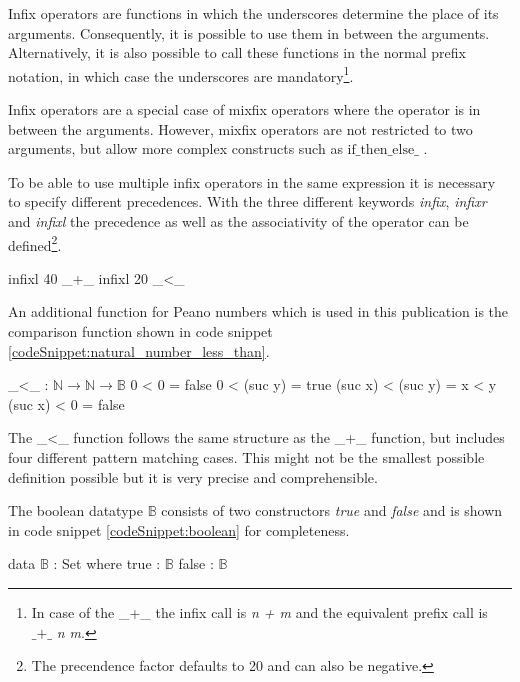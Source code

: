Infix operators are functions in which the underscores determine the place of its arguments. Consequently, it is possible to use them in between the arguments.
Alternatively, it is also possible to call these functions in the normal prefix notation, in which case the underscores are mandatory\footnote{In case of the \_+\_ the infix call is \emph{n + m} and the equivalent prefix call is $\text{\_+\_}$ \emph{n m}.}.

Infix operators are a special case of mixfix operators where the operator is in between the arguments.
However, mixfix operators are not restricted to two arguments, but allow more complex constructs such as $\text{if\_then\_else\_}$ \cite{AgdaReadTheDocs}.

To be able to use multiple infix operators in the same expression it is necessary to specify different precedences.
With the three different keywords \emph{infix}, \emph{infixr} and \emph{infixl} the precedence as well as the associativity of the operator can be defined\footnote{The precendence factor defaults to 20 and can also be negative.}.

\begin{codesnippet}[mathescape=true, caption={Precedence and associativity of some Peano number operators}, label={codeSnippet:natural_number_precedence}]
infixl 40 _+_
infixl 20 _<_
\end{codesnippet}

An additional function for Peano numbers which is used in this publication is the comparison function shown in code snippet \ref{codeSnippet:natural_number_less_than}.

\begin{codesnippet}[mathescape=true, caption={Peano numbers less-than}, label={codeSnippet:natural_number_less_than}]
_<_ : $\mathbb{N} \rightarrow \mathbb{N} \rightarrow \mathbb{B}$
0 < 0 = false
0 < (suc y) = true
(suc x) < (suc y) = x < y
(suc x) < 0 = false
\end{codesnippet}

The \_\textless\_ function follows the same structure as the \_+\_ function, but includes four different pattern matching cases. 
This might not be the smallest possible definition possible but it is very precise and comprehensible.

The boolean datatype $\mathbb{B}$ consists of two constructors \emph{true} and \emph{false} and is shown in code snippet \ref{codeSnippet:boolean} for completeness.

\begin{codesnippet}[mathescape=true, caption={Definition of the boolean datatype in Agda}, label={codeSnippet:boolean}]
data $\mathbb{B}$ : Set where
  true : $\mathbb{B}$
  false  : $\mathbb{B}$
\end{codesnippet}


